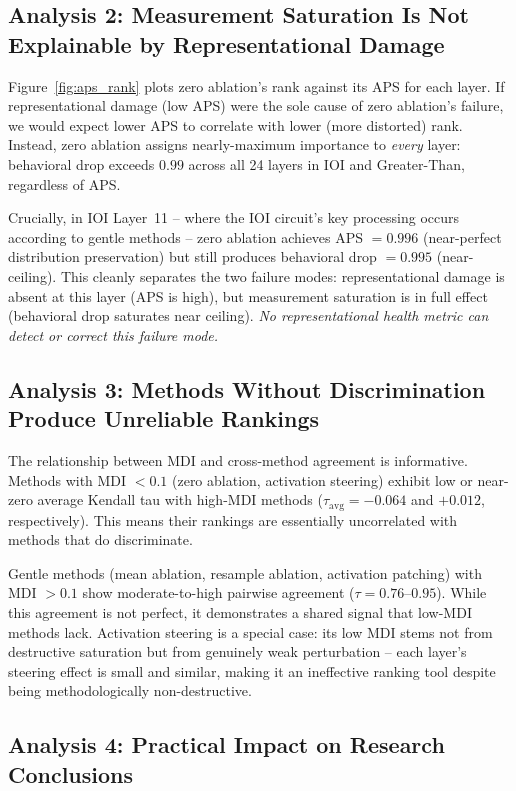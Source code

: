 \documentclass[pdflatex,sn-mathphys-num]{sn-jnl}
\begin{document}
\subsection{Analysis 2: Measurement Saturation Is Not Explainable by Representational Damage}

Figure~\ref{fig:aps_rank} plots zero ablation's rank against its APS for each layer. If representational damage (low APS) were the sole cause of zero ablation's failure, we would expect lower APS to correlate with lower (more distorted) rank. Instead, zero ablation assigns nearly-maximum importance to \emph{every} layer: behavioral drop exceeds $0.99$ across all 24 layers in IOI and Greater-Than, regardless of APS.

Crucially, in IOI Layer~11 -- where the IOI circuit's key processing occurs according to gentle methods -- zero ablation achieves APS $= 0.996$ (near-perfect distribution preservation) but still produces behavioral drop $= 0.995$ (near-ceiling). This cleanly separates the two failure modes: representational damage is absent at this layer (APS is high), but measurement saturation is in full effect (behavioral drop saturates near ceiling). \emph{No representational health metric can detect or correct this failure mode.}

\subsection{Analysis 3: Methods Without Discrimination Produce Unreliable Rankings}

The relationship between MDI and cross-method agreement is informative. Methods with MDI $< 0.1$ (zero ablation, activation steering) exhibit low or near-zero average Kendall tau with high-MDI methods ($\tau_{\text{avg}} = -0.064$ and $+0.012$, respectively). This means their rankings are essentially uncorrelated with methods that do discriminate.

Gentle methods (mean ablation, resample ablation, activation patching) with MDI $> 0.1$ show moderate-to-high pairwise agreement ($\tau = 0.76$--$0.95$). While this agreement is not perfect, it demonstrates a shared signal that low-MDI methods lack. Activation steering is a special case: its low MDI stems not from destructive saturation but from genuinely weak perturbation -- each layer's steering effect is small and similar, making it an ineffective ranking tool despite being methodologically non-destructive.

\subsection{Analysis 4: Practical Impact on Research Conclusions}
\end{document}
